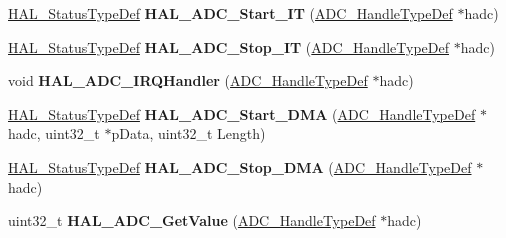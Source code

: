 \begin{DoxyCompactItemize}
\item 
\hyperlink{stm32f4xx__hal__def_8h_a63c0679d1cb8b8c684fbb0632743478f}{H\+A\+L\+\_\+\+Status\+Type\+Def} {\bfseries H\+A\+L\+\_\+\+A\+D\+C\+\_\+\+Start\+\_\+\+IT} (\hyperlink{struct_a_d_c___handle_type_def}{A\+D\+C\+\_\+\+Handle\+Type\+Def} $\ast$hadc)\hypertarget{group___a_d_c___exported___functions___group2_gaeb53035f47a937d54de2164d6c939a04}{}\label{group___a_d_c___exported___functions___group2_gaeb53035f47a937d54de2164d6c939a04}

\item 
\hyperlink{stm32f4xx__hal__def_8h_a63c0679d1cb8b8c684fbb0632743478f}{H\+A\+L\+\_\+\+Status\+Type\+Def} {\bfseries H\+A\+L\+\_\+\+A\+D\+C\+\_\+\+Stop\+\_\+\+IT} (\hyperlink{struct_a_d_c___handle_type_def}{A\+D\+C\+\_\+\+Handle\+Type\+Def} $\ast$hadc)\hypertarget{group___a_d_c___exported___functions___group2_gae44e6d3d0d9c60897daa7ccfd368952c}{}\label{group___a_d_c___exported___functions___group2_gae44e6d3d0d9c60897daa7ccfd368952c}

\item 
void {\bfseries H\+A\+L\+\_\+\+A\+D\+C\+\_\+\+I\+R\+Q\+Handler} (\hyperlink{struct_a_d_c___handle_type_def}{A\+D\+C\+\_\+\+Handle\+Type\+Def} $\ast$hadc)\hypertarget{group___a_d_c___exported___functions___group2_ga28aaa5662eced92c5a4d23d8bd6b29ca}{}\label{group___a_d_c___exported___functions___group2_ga28aaa5662eced92c5a4d23d8bd6b29ca}

\item 
\hyperlink{stm32f4xx__hal__def_8h_a63c0679d1cb8b8c684fbb0632743478f}{H\+A\+L\+\_\+\+Status\+Type\+Def} {\bfseries H\+A\+L\+\_\+\+A\+D\+C\+\_\+\+Start\+\_\+\+D\+MA} (\hyperlink{struct_a_d_c___handle_type_def}{A\+D\+C\+\_\+\+Handle\+Type\+Def} $\ast$hadc, uint32\+\_\+t $\ast$p\+Data, uint32\+\_\+t Length)\hypertarget{group___a_d_c___exported___functions___group2_ga7c3ef5532dddebe7fd76bb8f589d11fd}{}\label{group___a_d_c___exported___functions___group2_ga7c3ef5532dddebe7fd76bb8f589d11fd}

\item 
\hyperlink{stm32f4xx__hal__def_8h_a63c0679d1cb8b8c684fbb0632743478f}{H\+A\+L\+\_\+\+Status\+Type\+Def} {\bfseries H\+A\+L\+\_\+\+A\+D\+C\+\_\+\+Stop\+\_\+\+D\+MA} (\hyperlink{struct_a_d_c___handle_type_def}{A\+D\+C\+\_\+\+Handle\+Type\+Def} $\ast$hadc)\hypertarget{group___a_d_c___exported___functions___group2_gae113bcf7fc3d8ce07d68403bb5a11560}{}\label{group___a_d_c___exported___functions___group2_gae113bcf7fc3d8ce07d68403bb5a11560}

\item 
uint32\+\_\+t {\bfseries H\+A\+L\+\_\+\+A\+D\+C\+\_\+\+Get\+Value} (\hyperlink{struct_a_d_c___handle_type_def}{A\+D\+C\+\_\+\+Handle\+Type\+Def} $\ast$hadc)\hypertarget{group___a_d_c___exported___functions___group2_ga421008ca3885339acb12f400958ffbe4}{}\label{group___a_d_c___exported___functions___group2_ga421008ca3885339acb12f400958ffbe4}


\end{DoxyCompactItemize}
